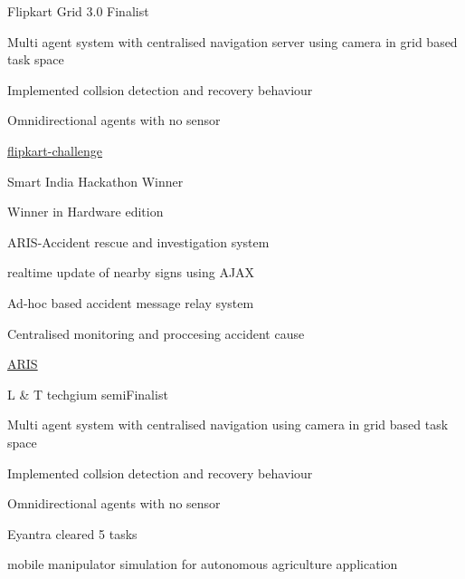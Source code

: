 
\begin{cventries}
	\cventry
	{} %
	{Flipkart Grid 3.0} %
	{Finalist} %
	{} %
	{
		\begin{cvitems} %
			\item {Multi agent system with centralised navigation server using camera in grid based task space}
			\item {Implemented collsion detection and recovery behaviour}
			\item {Omnidirectional agents with no sensor}
			\item {\href{https://github.com/gokulmaxi/flipkart-challenge} { \faGithub \space flipkart-challenge}}
		\end{cvitems}
	}
	\cventry
	{} %
	{Smart India Hackathon} %
	{Winner} %
	{} %
	{
		\begin{cvitems} %
			\item {Winner in Hardware edition}
			\item {ARIS-Accident rescue and investigation system}
			\item {realtime update of nearby signs using AJAX}
			\item {Ad-hoc based accident message relay system}
			\item {Centralised monitoring and proccesing accident cause}
			\item {\href{https://github.com/G-Gowtham/ARIS} { \faGithub \space ARIS}}
		\end{cvitems}
	}
	\cventry
	{} %
	{L \& T techgium} %
	{semi\-Finalist} %
	{} %
	{
		\begin{cvitems} %
			\item {Multi agent system with centralised navigation using camera in grid based task space}
			\item {Implemented collsion detection and recovery behaviour}
			\item {Omnidirectional agents with no sensor}
		\end{cvitems}
	}
	\cventry
	{} %
	{Eyantra} %
	{cleared 5 tasks} %
	{} %
	{
		\begin{cvitems} %
			\item {mobile manipulator simulation for autonomous agriculture application}

\end{cvitems}}
\end{cventries}
